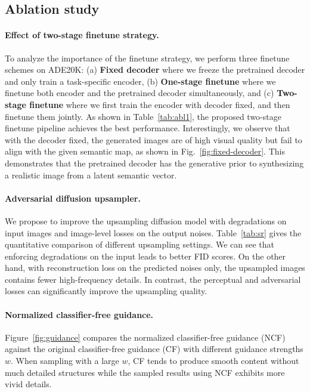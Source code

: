 \subsection{Ablation study}
\label{sec:ablation}
\paragraph{Effect of two-stage finetune strategy.} To analyze the importance of the finetune strategy, we perform three finetune schemes on ADE20K: (a) \textbf{Fixed decoder} where we freeze the pretrained decoder and only train a task-specific encoder, (b) \textbf{One-stage finetune} where we finetune both encoder and the pretrained decoder simultaneously, and (c) \textbf{Two-stage finetune} where we first train the encoder with decoder fixed, and then finetune them jointly. As shown in Table~\ref{tab:abl1}, the proposed two-stage finetune pipeline achieves the best performance. Interestingly, we observe that with the decoder fixed, the generated images are of high visual quality but fail to align with the given semantic map, as shown in Fig.~\ref{fig:fixed-decoder}. This demonstrates that the pretrained decoder has the generative prior to synthesizing a realistic image from a latent semantic vector.

\paragraph{Adversarial diffusion upsampler.} We propose to improve the upsampling diffusion model with  degradations on input images and image-level losses on the output noises. Table~\ref{tab:sr}  gives the quantitative comparison of different upsampling settings. We can see that enforcing degradations on the input leads to better FID scores. On the other hand, with reconstruction loss on the predicted noises only, the upsampled images contains fewer high-frequency details. In contrast, the perceptual and adversarial losses can significantly improve the upsampling quality.

\paragraph{Normalized classifier-free guidance.}
Figure~\ref{fig:guidance} compares  the normalized classifier-free guidance (NCF) against the original classifier-free guidance (CF) with different guidance strengths $w$. When sampling with a large $w$, CF tends to produce smooth content without much detailed structures  while the sampled results using NCF exhibits more vivid details.

